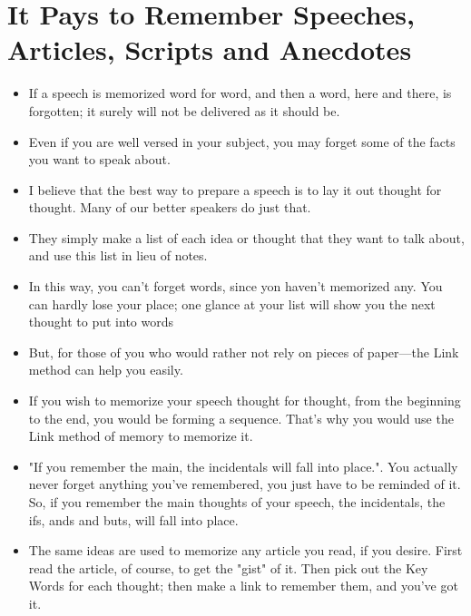    \section*{It Pays to Remember Speeches, Articles,
    Scripts and Anecdotes}
        \begin{itemize}
            \item If a speech is
            memorized word for word, and then a word, here and there,
            is forgotten; it surely will not be delivered as it should be.
            \item Even if you are well versed in your subject, you
            may forget some of the facts you want to speak about.
            \item I believe that the best way to prepare a speech is to lay
            it out thought for thought. Many of our better speakers do
            just that.
            \item They simply make a list of each idea or thought
            that they want to talk about, and use this list in lieu of
            notes.
            \item In this way, you can't forget words, since yon haven't
            memorized any. You can hardly lose your place; one glance
            at your list will show you the next thought to put into
            words
            \item But, for those of you who would rather not rely on pieces
            of paper—the Link method can help you easily.
            \item If you wish
            to memorize your speech thought for thought, from the
            beginning to the end, you would be forming a sequence.
            That's why you would use the Link method of memory to
            memorize it.
            \item "If you remember
            the main, the incidentals will fall into place.". You actually
            never forget anything you've remembered, you just have to
            be reminded of it. So, if you remember the main thoughts of your speech,
            the incidentals, the ifs, ands and buts, will fall into place.
            \item The same ideas are used to memorize any article you
            read, if you desire.
                \subitem First read the article, of course, to get
            the "gist" of it.
                \subitem Then pick out the Key Words for each
            thought; then make a link to remember them, and you've
            got it.

\end{itemize}
